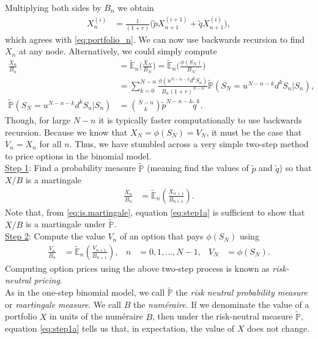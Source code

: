 \documentclass[12pt]{book}
\numberwithin{equation}{chapter}
\theoremstyle{plain}
\numberwithin{theorem}{section}
\theoremstyle{definition}
\numberwithin{exercise}{chapter}
\newcommand{\<}{\langle}
\renewcommand{\>}{\rangle}
\renewcommand{\(}{\left(}
\renewcommand{\)}{\right)}
\renewcommand{\[}{\left[}
\renewcommand{\]}{\right]}
\newcommand\Eb{\mathds{E}}
\newcommand\Pb{\mathds{P}}
\newcommand\Ebt{\widetilde{\Eb}}
\newcommand\Pbt{\widetilde{\Pb}}
\newcommand\qt{\widetilde{q}}
\theoremstyle{definition}
\numberwithin{question}{section}
\newcommand\pt{\widetilde{p}}
\begin{document}
Multiplying both sides by $B_n$ we obtain
\begin{align}
X_n^{(i)}
	&= \frac{1}{(1+r)} \Big( \pt X_{n+1}^{(i+1)}+ \qt X_{n+1}^{(i)} \Big) , 
\end{align}
which agrees with \eqref{eq:portfolio_n}.  We can now use backwards recursion to find $X_n$ at any node.  
Alternatively, we could simply compute
\begin{align}
\frac{X_n}{B_n}
	&=	\Ebt_n \Big( \frac{X_N}{B_N} \Big)
	 =	\Ebt_n \Big( \frac{\phi(S_N)}{B_N} \Big) \\
	&=	\sum_{k=0}^{N-n} \frac{\phi(u^{N-n-k} d^k S_n)}{B_n(1+r)^{N-n}} \Pbt( S_N = u^{N-n-k} d^k S_n | S_n ) , \\
\Pbt( S_N = u^{N-n-k} d^k S_n | S_n )
	&=	\binom{N-n}{k} \pt^{N-n-k} \qt^k .
\end{align}
Though, for large $N-n$ it is typically faster computationally to use backwards recursion.
Because we know that $X_N = \phi(S_N) = V_N$, it must be the case that $V_n = X_n$ for all $n$.  Thus, we have stumbled across a very simple two-step method to price options in the binomial model.
\\[0.5em]
\underline{Step 1}:  Find a probability measure $\Pbt$ (meaning find the values of $\pt$ and $\qt$) so that $X/B$ is a martingale
\begin{align}
\frac{X_n}{B_n}
	&=	\Ebt_n \( \frac{X_{n+1}}{B_{n+1}} \) . \label{eq:step1a}
\end{align}
Note that, from \eqref{eq:is.martingale}, equation \eqref{eq:step1a} is sufficient to show that $X/B$ is a martingale under $\Pbt$.
\\[0.5em]
\underline{Step 2}: Compute the value $V_n$ of an option that pays $\phi(S_N)$ using
\begin{align}
\frac{V_n}{B_n} 
	&= \Ebt_n \( \frac{V_{n+1}}{B_{n+1}} \) , &
n
	&=	0, 1, \ldots, N-1 , &
V_N
	&=	 \phi(S_N) . \label{eq:step2a}
\end{align}
Computing option prices using the above two-step process is known as \textit{risk-neutral pricing}.
\\[0.5em]
As in the one-step binomial model, we call $\Pbt$ the \textit{risk neutral probability measure} or \textit{martingale measure}.  We call $B$ the \textit{num\'eraire}.
If we denominate the value of a portfolio $X$ in units of the num\'eraire $B$, then under the risk-neutral measure $\Pbt$, equation \eqref{eq:step1a} tells us that, in expectation, the value of $X$ does not change.
\end{document}
